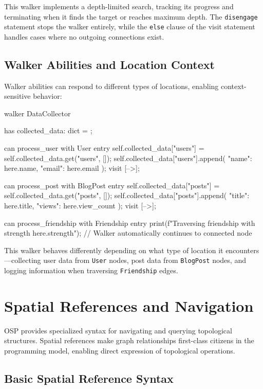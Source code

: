 This walker implements a depth-limited search, tracking its progress and terminating when it finds the target or reaches maximum depth. The \texttt{disengage} statement stops the walker entirely, while the \texttt{else} clause of the visit statement handles cases where no outgoing connections exist.

\subsection{Walker Abilities and Location Context}

Walker abilities can respond to different types of locations, enabling context-sensitive behavior:

\begin{jacblock}
walker DataCollector {
    has collected_data: dict = {};

    can process_user with User entry {
        self.collected_data["users"] = self.collected_data.get("users", []);
        self.collected_data["users"].append({
            "name": here.name,
            "email": here.email
        });
        visit [-->];
    }

    can process_post with BlogPost entry {
        self.collected_data["posts"] = self.collected_data.get("posts", []);
        self.collected_data["posts"].append({
            "title": here.title,
            "views": here.view_count
        });
        visit [-->];
    }

    can process_friendship with Friendship entry {
        print(f"Traversing friendship with strength {here.strength}");
        // Walker automatically continues to connected node
    }
}
\end{jacblock}

This walker behaves differently depending on what type of location it encounters—collecting user data from \texttt{User} nodes, post data from \texttt{BlogPost} nodes, and logging information when traversing \texttt{Friendship} edges.

\section{Spatial References and Navigation}

OSP provides specialized syntax for navigating and querying topological structures. Spatial references make graph relationships first-class citizens in the programming model, enabling direct expression of topological operations.

\subsection{Basic Spatial Reference Syntax}

